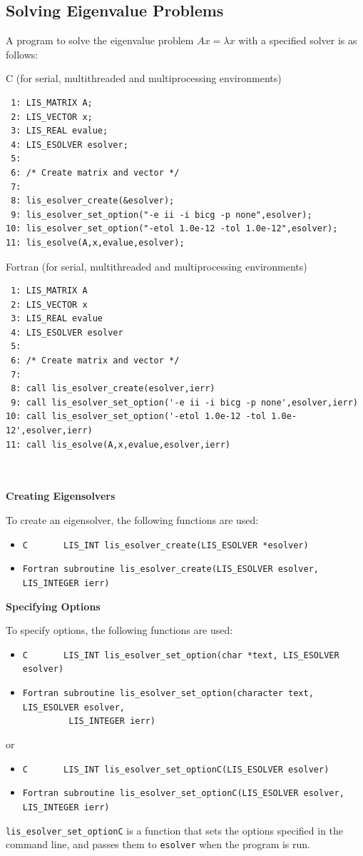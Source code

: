 \documentclass[a4paper]{article}
\begin{document}
\subsection{Solving Eigenvalue Problems}\label{subsec:solve}
A program to solve the eigenvalue problem $Ax = \lambda x$ with a specified 
solver is as follows: 
\begin{itemsquarebox}[l]{C (for serial, multithreaded and multiprocessing environments)}
\small
\begin{verbatim}
 1: LIS_MATRIX A; 
 2: LIS_VECTOR x; 
 3: LIS_REAL evalue; 
 4: LIS_ESOLVER esolver; 
 5: 
 6: /* Create matrix and vector */ 
 7: 
 8: lis_esolver_create(&esolver); 
 9: lis_esolver_set_option("-e ii -i bicg -p none",esolver); 
10: lis_esolver_set_option("-etol 1.0e-12 -tol 1.0e-12",esolver); 
11: lis_esolve(A,x,evalue,esolver); 
\end{verbatim}
\end{itemsquarebox}
\begin{itemsquarebox}[l]{Fortran (for serial, multithreaded and multiprocessing environments)}
\small
\begin{verbatim}
 1: LIS_MATRIX A 
 2: LIS_VECTOR x 
 3: LIS_REAL evalue
 4: LIS_ESOLVER esolver 
 5:
 6: /* Create matrix and vector */ 
 7:
 8: call lis_esolver_create(esolver,ierr) 
 9: call lis_esolver_set_option('-e ii -i bicg -p none',esolver,ierr) 
10: call lis_esolver_set_option('-etol 1.0e-12 -tol 1.0e-12',esolver,ierr) 
11: call lis_esolve(A,x,evalue,esolver,ierr) 
\end{verbatim}
\end{itemsquarebox}
\\ \\
\noindent
{\bf Creating Eigensolvers}

To create an eigensolver, the following functions are used:
\begin{itemize}
\item \verb|C       LIS_INT lis_esolver_create(LIS_ESOLVER *esolver)|
\item \verb|Fortran subroutine lis_esolver_create(LIS_ESOLVER esolver, LIS_INTEGER ierr) |
\end{itemize}

\noindent
{\bf Specifying Options}

To specify options, 
the following functions are used:
\begin{itemize}
\item \verb|C       LIS_INT lis_esolver_set_option(char *text, LIS_ESOLVER esolver)|
\item \verb|Fortran subroutine lis_esolver_set_option(character text, LIS_ESOLVER esolver,|\\
      \verb|         LIS_INTEGER ierr)|
\end{itemize}
or
\begin{itemize}
\item \verb|C       LIS_INT lis_esolver_set_optionC(LIS_ESOLVER esolver)|
\item \verb|Fortran subroutine lis_esolver_set_optionC(LIS_ESOLVER esolver, LIS_INTEGER ierr)|
\end{itemize}
\verb|lis_esolver_set_optionC| is a function that sets the options specified 
in the command line, and passes them to \verb|esolver| when the program is run. 
\end{document}
